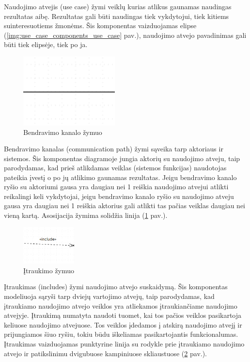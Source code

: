 Naudojimo atvejis (use case) žymi veiklų kurias atlikus gaunamas naudingas rezultatas aibę. Rezultatas gali būti naudingas tiek vykdytojui, tiek kitiems suinteresuotiems žmonėms. Šis komponentas vaizduojamas elipse (\ref{img:use_case_components_use_case} pav.),
naudojimo atvejo pavadinimas gali būti tiek elipsėje, tiek po ja.

\begin{figure}[H]
	\centering
	\includegraphics[width=5cm]{img/use_case_components/association}
	\caption{Bendravimo kanalo žymuo}
	\label{img:use_case_components_communication_path}
\end{figure}

Bendravimo kanalas (communication path) žymi sąveika tarp aktoriaus ir sistemos. Šis komponentas diagramoje jungia aktorių su naudojimo atveju, taip parodydamas, kad prieš atlikdamas veiklas (sistemos funkcijas) naudotojas pateikia įvestį o po jų atlikimo gaunamas rezultatas. Jeigu bendravimo kanalo ryšio su aktoriumi gausa yra daugiau nei 1 reiškia naudojimo atvejui atlikti reikalingi keli vykdytojai, jeigu bendravimo kanalo ryšio su naudojimo atveju gausa yra daugiau nei 1 reiškia aktorius gali atlikti tas pačias veiklas daugiau nei vieną kartą. Asosijacija žymima solidžia linija (\ref{img:use_case_components_communication_path} pav.).

\begin{figure}[H]
	\centering
	\includegraphics[height=2cm]{img/use_case_components/includes}
	\caption{Įtraukimo žymuo}
	\label{img:use_case_components_includes}
\end{figure}

Įtraukimas (includes) žymi naudojimo atvejo suskaidymą. Šis komponentas modeliuoja sąryši tarp dviejų vartojimo atvejų, taip parodydamas, kad įtraukiamo naudojimo atvejo veiklos yra atliekamos įtraukiančiame naudojimo atvejyje. Įtraukimą numatyta naudoti tuomet, kai tos pačios veiklos pasikartoja keliuose naudojimo atvejuose. Tos veiklos įdedamos į atskirą naudojimo atvejį ir prijungiamos šiuo ryšiu, tokiu būdu iškeliamas pasikartojantis funkcionalumas. Įtraukimas vaizduojamas punktyrine linija su rodykle  prie įtraukiamo naudojimo atvejo ir patikslinimu dvigubuose kampiniuose skliaustuose (\ref{img:use_case_components_includes} pav.).

